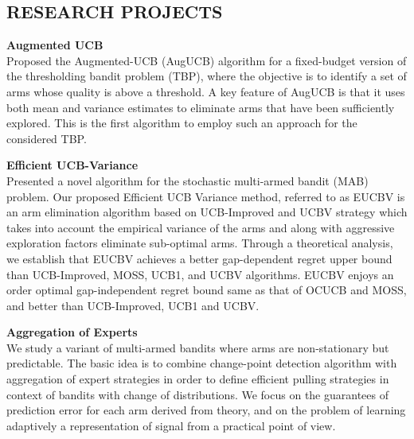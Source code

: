 \documentclass[margin,11pt]{res}
\begin{document}
\begin{resume}
\section{RESEARCH PROJECTS}
\par 

\textbf{Augmented UCB}\\
Proposed the Augmented-UCB (AugUCB) algorithm for a fixed-budget version of the thresholding bandit problem (TBP), where the objective is to identify a set of arms whose quality is above a threshold. A key feature of AugUCB is that it uses both mean and variance estimates to eliminate arms that have been sufficiently explored. This is the first algorithm to employ such an approach for the considered TBP.
\par

\textbf{Efficient UCB-Variance}\\
Presented a novel algorithm for the stochastic multi-armed bandit (MAB) problem. Our proposed Efficient UCB Variance method, referred to as EUCBV is an arm elimination algorithm based on UCB-Improved and UCBV strategy which takes into account the empirical variance of the arms and along with aggressive exploration factors eliminate sub-optimal arms. Through a theoretical analysis, we establish that EUCBV achieves a better gap-dependent regret upper bound than UCB-Improved, MOSS, UCB1, and UCBV algorithms. EUCBV enjoys an order optimal gap-independent regret bound same as that of OCUCB and MOSS, and better than UCB-Improved, UCB1 and UCBV.
\par

\textbf{Aggregation of Experts}\\
We study a variant of multi-armed bandits where arms are non-stationary but predictable. The basic idea is to combine change-point detection algorithm with aggregation of expert strategies in order to define efficient pulling strategies in context of bandits with change of distributions. We focus on the guarantees of prediction error for each arm derived from theory, and on the problem of learning adaptively a representation of signal from a practical point of view. 


\end{resume}
\end{document}

